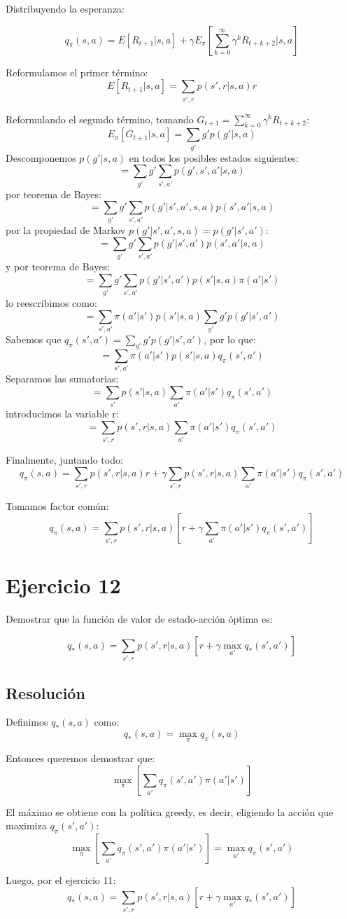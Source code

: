 \documentclass[12pt,a4paper]{article}
\begin{document}
Distribuyendo la esperanza:

$$ q_\pi(s,a) = E[R_{t+1}|s,a] + \gamma E_\pi[\sum_{k=0}^{\infty} \gamma^k R_{t+k+2}|s,a] $$

Reformulamos el primer término:
$$ E[R_{t+1}|s,a] = \sum_{s',r} p(s',r|s,a) r $$

Reformulando el segundo término, tomando $G_{t+1} = \sum_{k=0}^{\infty} \gamma^k R_{t+k+2}$:
$$ E_\pi[G_{t+1}|s,a] = \sum_{g'} g' p(g'|s,a) $$
Descomponemos $p(g'|s,a)$ en todos los posibles estados siguientes:
$$ = \sum_{g'} g' \sum_{s',a'} p(g',s',a'|s,a) $$
por teorema de Bayes:
$$ = \sum_{g'} g' \sum_{s',a'} p(g'|s',a',s,a) p(s',a'|s,a) $$
por la propiedad de Markov $p(g'|s',a',s,a) = p(g'|s',a')$:
$$ = \sum_{g'} g' \sum_{s',a'} p(g'|s',a') p(s',a'|s,a) $$
y por teorema de Bayes:
$$ = \sum_{g'} g' \sum_{s',a'} p(g'|s',a') p(s'|s,a) \pi(a'|s') $$
lo reescribimos como:
$$ = \sum_{s',a'} \pi(a'|s') p(s'|s,a) \sum_{g'} g' p(g'|s',a') $$
Sabemos que $q_\pi(s',a') = \sum_{g'} g' p(g'|s',a')$, por lo que:
$$ = \sum_{s',a'} \pi(a'|s') p(s'|s,a) q_\pi(s',a') $$
Separamos las sumatorias:
$$ = \sum_{s'} p(s'|s,a) \sum_{a'} \pi(a'|s') q_\pi(s',a') $$
introducimos la variable r:
$$ = \sum_{s',r} p(s',r|s,a) \sum_{a'} \pi(a'|s') q_\pi(s',a') $$

Finalmente, juntando todo:
$$ q_\pi(s,a) = \sum_{s',r} p(s',r|s,a) r + \gamma \sum_{s',r} p(s',r|s,a) \sum_{a'} \pi(a'|s') q_\pi(s',a') $$

Tomamos factor común:
$$ q_\pi(s,a) = \sum_{s',r} p(s',r|s,a) [r + \gamma \sum_{a'} \pi(a'|s') q_\pi(s',a')] $$

\section{Ejercicio 12}

Demostrar que la función de valor de estado-acción óptima es:

$$ q_*(s,a) = \sum_{s',r} p(s',r|s,a) [r + \gamma \max_{a'} q_*(s',a')] $$

\subsection{Resolución}

Definimos $q_*(s,a)$ como:
$$ q_*(s,a) = \max_\pi q_\pi(s,a)$$

Entonces queremos demostrar que:
$$ \max_\pi [\sum_{a'}q_\pi(s',a') \pi(a'|s')] $$

El máximo se obtiene con la política greedy, es decir, eligiendo la acción que maximiza $q_\pi(s',a')$:
$$ \max_\pi [\sum_{a'}q_\pi(s',a') \pi(a'|s')] = \max_{a'} q_\pi(s',a') $$

Luego, por el ejercicio 11:
$$ q_*(s,a) = \sum_{s',r} p(s',r|s,a) [r + \gamma \max_{a'} q_*(s',a')] $$
\end{document}
